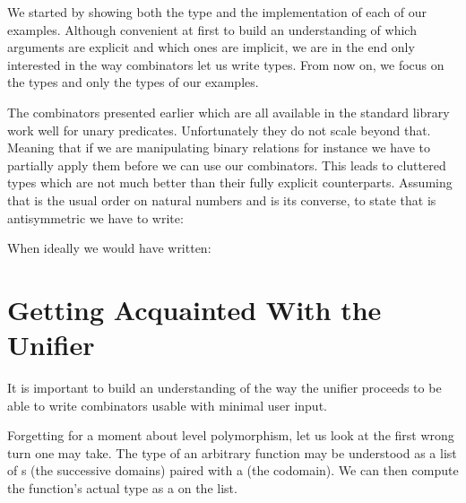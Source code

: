 We started by showing both the type and the implementation of each of our
examples. Although convenient at first to build an understanding of which
arguments are explicit and which ones are implicit, we are in the end only
interested in the way combinators let us write types. From now on, we
focus on the types and only the types of our examples.

The combinators presented earlier which are all available in the standard
library work well for unary predicates. Unfortunately they do not scale
beyond that. Meaning that if we are manipulating binary relations for
instance we have to partially apply them before we can use our combinators.
This leads to cluttered types which are not much better than their fully
explicit counterparts. Assuming that  is the usual order on natural
numbers and  is its converse, to state that  is antisymmetric
we have to write:


When ideally we would have written:



\section{Getting Acquainted With the Unifier}

It is important to build an understanding of the way the unifier proceeds
to be able to write combinators usable with minimal user input.

Forgetting for a moment about level polymorphism, let us look at the first
wrong turn one may take. The type of an arbitrary function may be understood
as a list of s (the successive domains) paired with a  (the
codomain). We can then compute the function's actual type as a  on
the list.




